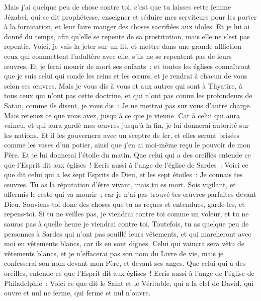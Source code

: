 \begin{multicols}{2}
Mais j'ai quelque peu de chose contre toi, c'est que tu laisses cette femme Jézabel, qui se dit prophétesse, enseigner et séduire mes serviteurs pour les porter à la fornication, et leur faire manger des choses sacrifiées aux idoles.
Et je lui ai donné du temps, afin qu'elle se repente de sa prostitution, mais elle ne s'est pas repentie.
Voici, je vais la jeter sur un lit, et mettre dans une grande affliction ceux qui commettent l'adultère avec elle, s'ils ne se repentent pas de leurs œuvres.
Et je ferai mourir de mort ses enfants~; et toutes les églises connaîtront que je suis celui qui sonde les reins et les cœurs, et je rendrai à chacun de vous selon ses œuvres.
Mais je vous dis à vous et aux autres qui sont à Thyatire, à tous ceux qui n'ont pas cette doctrine, et qui n'ont pas connu les profondeurs de Satan, comme ils disent, je vous dis~: Je ne mettrai pas sur vous d'autre charge.
Mais retenez ce que vous avez, jusqu'à ce que je vienne.
Car à celui qui aura vaincu, et qui aura gardé mes œuvres jusqu'à la fin, je lui donnerai autorité sur les nations.
Et il les gouvernera avec un sceptre de fer, et elles seront brisées comme les vases d'un potier, ainsi que j'en ai moi-même reçu le pouvoir de mon Père.
Et je lui donnerai l'étoile du matin.
Que celui qui a des oreilles entende ce que l'Esprit dit aux églises~!
\VerseOne{}Ecris aussi à l'ange de l'église de Sardes~: Voici ce que dit celui qui a les sept Esprits de Dieu, et les sept étoiles~: Je connais tes œuvres. Tu as la réputation d'être vivant, mais tu es mort.
Sois vigilant, et affermis le reste qui va mourir~; car je n'ai pas trouvé tes œuvres parfaites devant Dieu.
Souviens-toi donc des choses que tu as reçues et entendues, garde-les, et repens-toi. Si tu ne veilles pas, je viendrai contre toi comme un voleur, et tu ne sauras pas à quelle heure je viendrai contre toi.
Toutefois, tu as quelque peu de personnes à Sardes qui n'ont pas souillé leurs vêtements, et qui marcheront avec moi en vêtements blancs, car ils en sont dignes.
Celui qui vaincra sera vêtu de vêtements blancs, et je n'effacerai pas son nom du Livre de vie, mais je confesserai son nom devant mon Père, et devant ses anges.
Que celui qui a des oreilles, entende ce que l'Esprit dit aux églises~!
Ecris aussi à l'ange de l'église de Philadelphie~: Voici ce que dit le Saint et le Véritable, qui a la clef de David, qui ouvre et nul ne ferme, qui ferme et nul n'ouvre.

\end{multicols}
